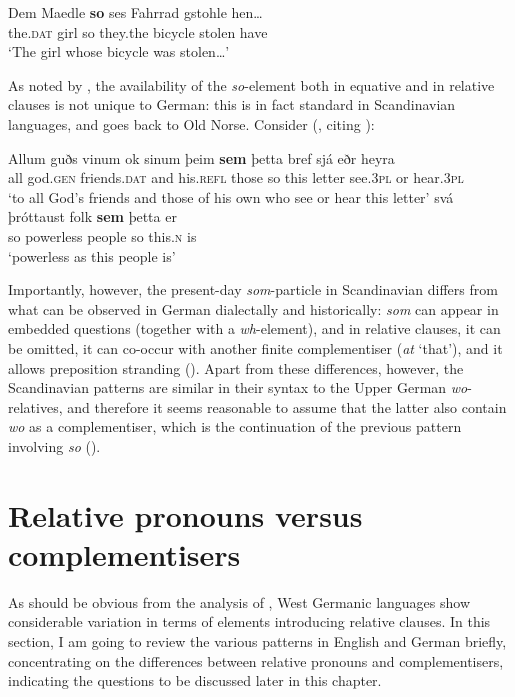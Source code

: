 \ea \gll Dem Maedle \textbf{so} ses Fahrrad gstohle hen\ldots \label{maedle}\\
the.\textsc{dat} girl so they.the bicycle stolen have\\
\glt `The girl whose bicycle was stolen\ldots'
\z

\begin{sloppypar}
As noted by \citet[158]{brandnerbraeuning2013}, the availability of the \textit{so}-element both in equative and in relative clauses is not unique to German: this is in fact standard in Scandinavian languages, and goes back to Old Norse. Consider (\citealt[158, ex. 63 and 64]{brandnerbraeuning2013}, citing \citealt{faarlund2004}):
\end{sloppypar}

\ea
\ea \gll Allum guðs vinum ok sinum þeim \textbf{sem} þetta bref sj\'a eðr heyra\\
all god.\textsc{gen} friends.\textsc{dat} and his.\textsc{refl} those so this letter see.\textsc{3pl} or hear.\textsc{3pl}\\
\glt `to all God's friends and those of his own who see or hear this letter'
\ex \gll sv\'a þr\'ottaust folk \textbf{sem} þetta er\\
so powerless people so this.\textsc{n} is\\
\glt `powerless as this people is'
\z
\z

Importantly, however, the present-day \textit{som}-particle in Scandinavian differs from what can be observed in German dialectally and historically: \textit{som} can appear in embedded questions (together with a \textit{wh}-element), and in relative clauses, it can be omitted, it can co-occur with another finite complementiser (\textit{at} `that'), and it allows preposition stranding (\citealt[158--162]{brandnerbraeuning2013}). Apart from these differences, however, the Scandinavian patterns are similar in their syntax to the Upper German \textit{wo}-relatives, and therefore it seems reasonable to assume that the latter also contain \textit{wo} as a complementiser, which is the continuation of the previous pattern involving \textit{so} (\citealt[163--165]{brandnerbraeuning2013}).

\section{Relative pronouns versus complementisers} \label{sec:4relativepronouns}
As should be obvious from the analysis of \citet{brandnerbraeuning2013}, West Germanic languages show considerable variation in terms of elements introducing relative clauses. In this section, I am going to review the various patterns in English and German briefly, concentrating on the differences between relative pronouns and complementisers, indicating the questions to be discussed later in this chapter.

